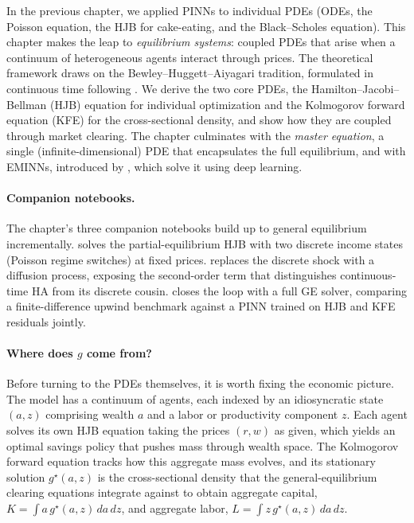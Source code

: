 \documentclass[11pt,a4paper]{report}
\begin{document}
In the previous chapter, we applied PINNs to individual PDEs (ODEs, the Poisson equation, the HJB for cake-eating, and the Black--Scholes equation).  This chapter makes the leap to \emph{equilibrium systems}: coupled PDEs that arise when a continuum of heterogeneous agents interact through prices.  The theoretical framework draws on the Bewley--Huggett--Aiyagari tradition, formulated in continuous time following \citet{achdou2022income}.  We derive the two core PDEs, the Hamilton--Jacobi--Bellman (HJB) equation for individual optimization and the Kolmogorov forward equation (KFE) for the cross-sectional density, and show how they are coupled through market clearing.  The chapter culminates with the \emph{master equation}, a single (infinite-dimensional) PDE that encapsulates the full equilibrium, and with EMINNs, introduced by \citet{gu2024masterequations}, which solve it using deep learning.

\paragraph{Companion notebooks.}  The chapter's three companion notebooks build up to general equilibrium incrementally.   solves the partial-equilibrium HJB with two discrete income states (Poisson regime switches) at fixed prices.   replaces the discrete shock with a diffusion process, exposing the second-order term that distinguishes continuous-time HA from its discrete cousin.   closes the loop with a full GE solver, comparing a finite-difference upwind benchmark against a PINN trained on HJB and KFE residuals jointly.

\paragraph{Where does $g$ come from?}  Before turning to the PDEs themselves, it is worth fixing the economic picture.  The model has a continuum of agents, each indexed by an idiosyncratic state $(a,z)$ comprising wealth $a$ and a labor or productivity component $z$.  Each agent solves its own HJB equation taking the prices $(r,w)$ as given, which yields an optimal savings policy that pushes mass through wealth space.  The Kolmogorov forward equation tracks how this aggregate mass evolves, and its stationary solution $g^\star(a,z)$ is the cross-sectional density that the general-equilibrium clearing equations integrate against to obtain aggregate capital, $K = \int a\, g^\star(a,z)\,da\,dz$, and aggregate labor, $L = \int z\, g^\star(a,z)\,da\,dz$.
\end{document}
